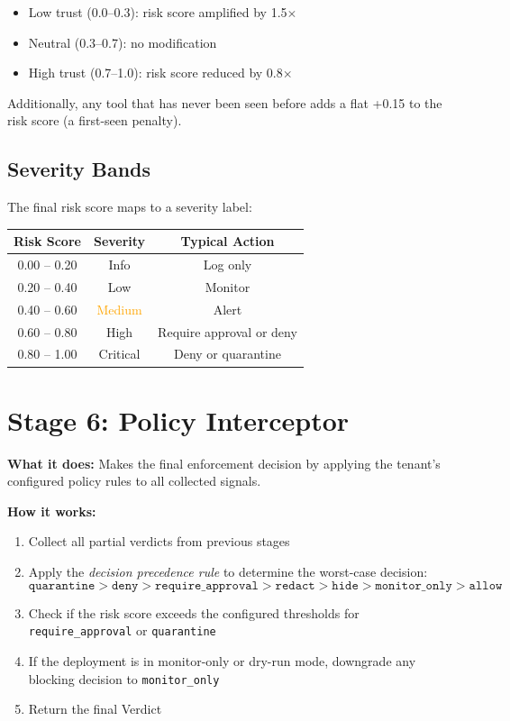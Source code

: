 \documentclass[12pt,a4paper]{report}
\begin{document}
\begin{itemize}
  \item Low trust (0.0--0.3): risk score amplified by 1.5$\times$
  \item Neutral (0.3--0.7): no modification
  \item High trust (0.7--1.0): risk score reduced by 0.8$\times$
\end{itemize}

Additionally, any tool that has never been seen before adds a flat +0.15 to
the risk score (a first-seen penalty).

\subsection{Severity Bands}

The final risk score maps to a severity label:

\begin{center}
\begin{tabular}{ccc}
  \toprule
  \textbf{Risk Score} & \textbf{Severity} & \textbf{Typical Action} \\
  \midrule
  0.00 -- 0.20 & \textcolor{mcpblue}{Info} & Log only \\
  0.20 -- 0.40 & \textcolor{mcpgreen}{Low} & Monitor \\
  0.40 -- 0.60 & \textcolor{orange}{Medium} & Alert \\
  0.60 -- 0.80 & \textcolor{orange!80!red}{High} & Require approval or deny \\
  0.80 -- 1.00 & \textcolor{mcpred}{Critical} & Deny or quarantine \\
  \bottomrule
\end{tabular}
\end{center}

\section{Stage 6: Policy Interceptor}

\textbf{What it does:} Makes the final enforcement decision by applying the
tenant's configured policy rules to all collected signals.

\textbf{How it works:}
\begin{enumerate}
  \item Collect all partial verdicts from previous stages
  \item Apply the \textit{decision precedence rule} to determine the worst-case decision:
    \[
      \texttt{quarantine} > \texttt{deny} > \texttt{require\_approval} >
      \texttt{redact} > \texttt{hide} > \texttt{monitor\_only} > \texttt{allow}
    \]
  \item Check if the risk score exceeds the configured thresholds for
    \texttt{require\_approval} or \texttt{quarantine}
  \item If the deployment is in monitor-only or dry-run mode, downgrade any
    blocking decision to \texttt{monitor\_only}
  \item Return the final Verdict
\end{enumerate}
\end{document}

